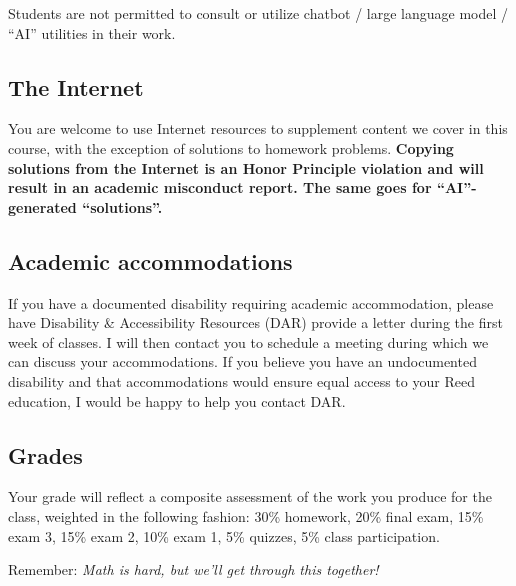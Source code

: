 \documentclass[11pt,twoside]{amsart}
\begin{document}
Students are not permitted to consult or utilize chatbot / large language model / ``AI'' utilities in their work.

\subsection*{The Internet}
You are welcome to use Internet resources to supplement content we cover in this course, with the exception of solutions to homework problems.  \textbf{Copying solutions from the Internet is an Honor Principle violation and will result in an academic misconduct report. The same goes for ``AI''-generated ``solutions''.}

\subsection*{Academic accommodations}
If you have a documented disability requiring academic accommodation, please have  Disability \& Accessibility Resources (DAR)  provide a letter during the first week of classes.  I will then contact you to schedule a meeting during which we can discuss your accommodations.  If you believe you have an undocumented disability and that accommodations would ensure equal access to your Reed education, I would be happy to help you contact DAR.

\subsection*{Grades}
Your grade will reflect a composite assessment of the work you produce for the class, weighted in the following fashion:  30\% homework, 20\% final exam, 15\% exam 3, 15\% exam 2, 10\% exam 1, 5\% quizzes, 5\% class participation.

\bigskip \bigskip

\begin{center}
Remember: \emph{Math is hard, but we'll get through this together!}
\end{center}
\end{document}
